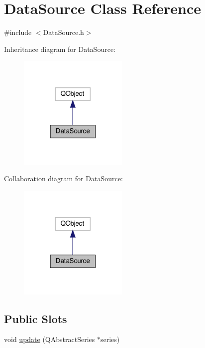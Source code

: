 \hypertarget{class_data_source}{}\section{Data\+Source Class Reference}
\label{class_data_source}


{\ttfamily \#include $<$Data\+Source.\+h$>$}



Inheritance diagram for Data\+Source\+:
\nopagebreak
\begin{figure}[H]
\begin{center}
\leavevmode
\includegraphics[width=148pt]{class_data_source__inherit__graph}
\end{center}
\end{figure}


Collaboration diagram for Data\+Source\+:
\nopagebreak
\begin{figure}[H]
\begin{center}
\leavevmode
\includegraphics[width=148pt]{class_data_source__coll__graph}
\end{center}
\end{figure}
\subsection*{Public Slots}
\begin{DoxyCompactItemize}
\item 
void \hyperlink{class_data_source_a89f6b91336e0beb7958a8f41c24417e2}{update} (Q\+Abstract\+Series $\ast$series)
\end{DoxyCompactItemize}
